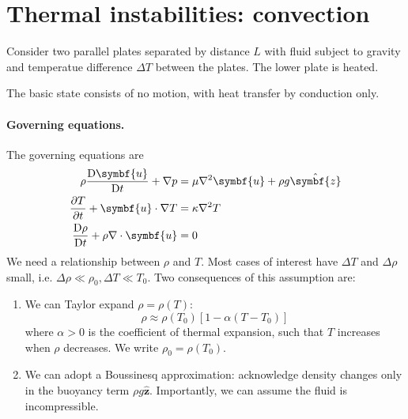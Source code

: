 \documentclass{jknotes}
\renewcommand{\u}{\symbf{u}}
\begin{document}
\section{Thermal instabilities: convection}
Consider two parallel plates separated by distance $L$ with fluid subject to
gravity and temperatue difference $\Delta T$ between the plates. The lower
plate is heated. 
\begin{center}
\end{center}

The basic state consists of no motion, with heat transfer by conduction only.
\paragraph{Governing equations.}
The governing equations are 
\begin{align}
	\rho \frac{\diffD \u}{\diffD t} + \nabla p &= \mu \nabla^2 \u + \rho g
	\hat{\symbf{z}} \\
	\frac{\partial T}{\partial t} + \u \cdot \nabla T &= \kappa \nabla^2 T \\
	\frac{\diffD \rho}{\diffD t} + \rho \nabla \cdot \u &= 0
\end{align}
We need a relationship between $\rho$ and $T$. Most cases of interest have
$\Delta T$ and $\Delta \rho$ small, i.e. $\Delta \rho \ll \rho_0, \Delta T \ll
T_0$. Two consequences of this assumption are:
\begin{enumerate}
	\item We can Taylor expand $\rho = \rho(T)$:
		\begin{equation}
			\rho \approx \rho(T_0) \left[ 1 - \alpha(T-T_0)\right]
		\end{equation}
		where $\alpha > 0$ is the coefficient of thermal expansion, such that
		$T$ increases when $\rho$ decreases. We write $\rho_0 = \rho(T_0)$.
	\item We can adopt a Boussinesq approximation: acknowledge density changes
		only in the buoyancy term $\rho g \hat{\symbf{z}}$. Importantly, we
		can assume the fluid is incompressible.
\end{enumerate}
\end{document}
